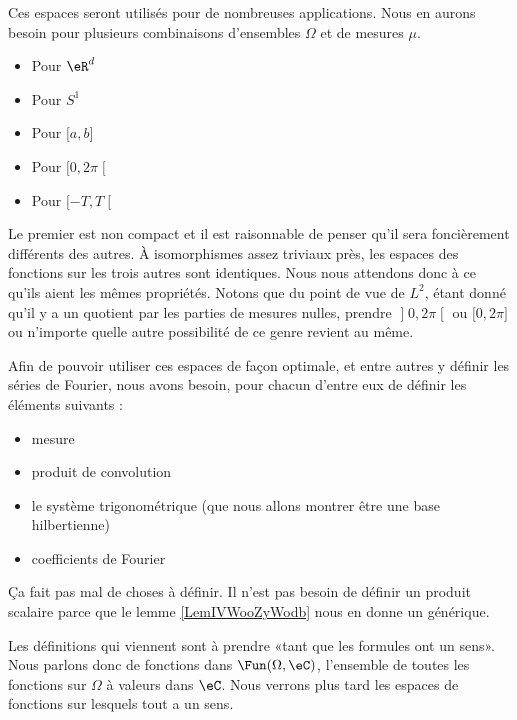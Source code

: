 \begin{normaltext}
    Ces espaces seront utilisés pour de nombreuses applications. Nous en aurons besoin pour plusieurs combinaisons d'ensembles \( \Omega\) et de mesures \( \mu\).
    \begin{itemize}
        \item Pour \( \eR^d\)
        \item Pour \( S^1\)
        \item Pour \( \mathopen[ a , b \mathclose]\)
        \item Pour \( \mathopen[ 0 , 2\pi \mathclose[\)
            \item Pour \( \mathopen[ -T , T \mathclose[\)
    \end{itemize}
    Le premier est non compact et il est raisonnable de penser qu'il sera foncièrement différents des autres. À isomorphismes assez triviaux près, les espaces des fonctions sur les trois autres sont identiques. Nous nous attendons donc à ce qu'ils aient les mêmes propriétés. Notons que du point de vue de \( L^2\), étant donné qu'il y a un quotient par les parties de mesures nulles, prendre \( \mathopen] 0 , 2\pi \mathclose[\) ou \( \mathopen[ 0 , 2\pi \mathclose]\) ou n'importe quelle autre possibilité de ce genre revient au même.

    Afin de pouvoir utiliser ces espaces de façon optimale, et entre autres y définir les séries de Fourier, nous avons besoin, pour chacun d'entre eux de définir les éléments suivants :
    \begin{itemize}
        \item mesure
        \item produit de convolution
        \item le système trigonométrique (que nous allons montrer être une base hilbertienne)
        \item coefficients de Fourier
    \end{itemize}
    Ça fait pas mal de choses à définir. Il n'est pas besoin de définir un produit scalaire parce que le lemme \ref{LemIVWooZyWodb} nous en donne un générique.

    Les définitions qui viennent sont à prendre «tant que les formules ont un sens». Nous parlons donc de fonctions dans \( \Fun(\Omega,\eC)\), l'ensemble de toutes les fonctions sur \( \Omega\) à valeurs dans \( \eC\). Nous verrons plus tard les espaces de fonctions sur lesquels tout a un sens.
\end{normaltext}

